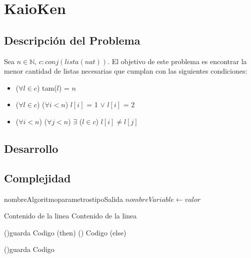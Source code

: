 \section{KaioKen}

	\subsection{Descripción del Problema}
		Sea $n \in \mathds{N}$, $c: conj(lista(nat))$. El objetivo de este problema es encontrar la menor cantidad de listas necesarias que cumplan con las siguientes condiciones: 
		    \begin{itemize}
                \item ($ \forall l \in c$) tam($l$) = $n$
                \item ($ \forall l \in c$) ($ \forall i < n$) $l[i]$ = 1 $\vee$ $l[i]$ = 2
                \item ($ \forall i < n$) ($ \forall j < n$) $\exists$ ($l \in c$) $l[i] \neq l[j]$
            \end{itemize}

	
    \subsection{Desarrollo}


    \subsection{Complejidad}

    \begin{algoritmo}{nombreAlgoritmo}{parametros}{tipoSalida}
   $nombreVariable \gets valor$ \;

  Contenido de la linea  
  Contenido de la linea  


  \eIf(){guarda}{
    Codigo (then) \;
  }(){
    Codigo (else) \;
  }


  \While(){guarda}{
    Codigo \;
  }

\end{algoritmo}


